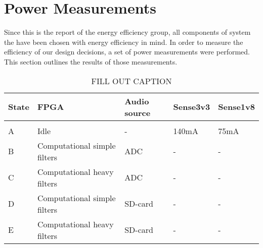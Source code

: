 \section{Power Measurements}

Since this is the report of the energy efficiency group, all components of
system the have been chosen with energy efficiency in mind. In order to measure
the efficiency of our design decisions, a set of power measurements were
performed. This section outlines the results of those measurements.

\begin{table}
    \begin{tabular}{lllll}
	State & FPGA                         & Audio source & Sense3v3 & Sense1v8 \\
	\hline \\
	A     & Idle                         & -            & 140mA    & 75mA \\
	B     & Computational simple filters & ADC          & -        & - \\
	C     & Computational heavy filters  & ADC          & -        & - \\
        D     & Computational simple filters & SD-card      & -        & - \\
        E     & Computational heavy filters  & SD-card      & -        & -
    \end{tabular}
    \label{tab:results/power-measurement}
    \caption{FILL OUT CAPTION}
\end{table}

